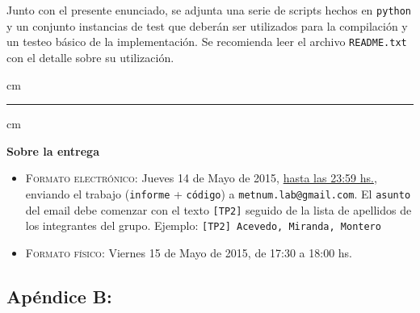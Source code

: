 Junto con el presente enunciado, se adjunta una serie de scripts hechos en \verb+python+ y un conjunto instancias de test que deber\'an ser utilizados para la compilaci\'on y un testeo b\'asico de la implementaci\'on. Se recomienda leer el archivo \verb+README.txt+ con el detalle sobre su utilizaci\'on.

 cm
\hrule
{} cm

{\bf Sobre la entrega}
\begin{itemize}
\item \textsc{Formato electr\'onico:} Jueves 14 de Mayo de 2015, \underline{hasta las 23:59 hs.}, enviando el trabajo
(\texttt{informe} + \texttt{c\'odigo}) a \texttt{metnum.lab@gmail.com}. El \texttt{asunto} del email debe comenzar con el texto \verb|[TP2]| seguido
de la lista de apellidos de los integrantes del grupo. Ejemplo: \texttt{[TP2] Acevedo, Miranda, Montero}
\item \textsc{Formato f\'isico:} Viernes 15 de Mayo de 2015, de 17:30 a 18:00 hs.
\end{itemize}

\newpage

\subsection{Apéndice B:}

